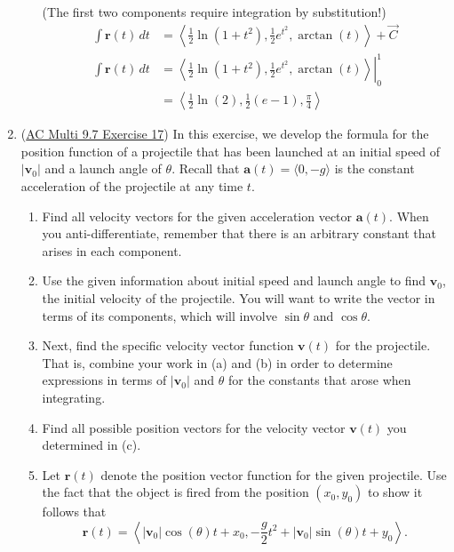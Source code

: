 \documentclass[10pt]{article}
\newcommand{\va}{\mathbf{a}}
\newcommand{\vv}{\mathbf{v}}
\newcommand{\vr}{\mathbf{r}}
\newenvironment{red}{\color{red}}{\ignorespacesafterend}
\begin{document}
\begin{enumerate}[leftmargin=0pt]
\begin{enumerate}
    \begin{red}
        (The first two components require integration by substitution!)
        \begin{align*}
            \int\vr(t)\, dt &= \left\langle
                \frac12 \ln(1+t^2),
                \frac12 e^{t^2},
                \arctan(t)
            \right\rangle + \vec{C}\\
            \int\vr(t)\, dt &= \left.\left\langle
                \frac12 \ln(1+t^2),
                \frac12 e^{t^2},
                \arctan(t)
            \right\rangle \right|_0^1 \\
            &= \left\langle
                \frac12 \ln(2),
                \frac12 (e - 1),
                \frac{\pi}{4}
            \right\rangle
        \end{align*}
    \end{red}
\end{enumerate}

\item (\href{https://activecalculus.org/multi/S-9-7-Vector-Valued-Functions-Derivatives.html#Ez_9_7_5}{AC Multi 9.7 Exercise 17}) In this exercise, we develop the formula for the position function of a projectile that has been launched at an initial speed of $|\vv_0|$ and a launch angle of $\theta$. Recall that $\va(t) = \langle 0, -g\rangle$ is the constant acceleration of the projectile at any time $t$.
\begin{enumerate}
    \item Find all velocity vectors for the given acceleration vector $\va(t)$. When you anti-differentiate, remember that there is an arbitrary constant that arises in each component.
    \item Use the given information about initial speed and launch angle to find $\vv_0$, the initial velocity of the projectile. You will want to write the vector in terms of its components, which will involve $\sin\theta$ and $\cos\theta$.
    \item Next, find the specific velocity vector function $\vv(t)$ for the projectile. That is, combine your work in (a) and (b) in order to determine expressions in terms of $|\vv_0|$ and $\theta$ for the constants that arose when integrating.
    \item Find all possible position vectors for the velocity vector $\vv(t)$ you determined in (c).
    \item Let $\vr(t)$ denote the position vector function for the given projectile. Use the fact that the object is fired from the position $(x_0, y_0)$ to show it follows that
    \begin{equation*}
        \vr(t) = \left\langle |\vv_0| \cos(\theta)t + x_0, -\frac{g}{2}t^2 + |\vv_0| \sin(\theta)t + y_0 \right\rangle.
    \end{equation*}
\end{enumerate}

\end{enumerate}
	
\end{document}
